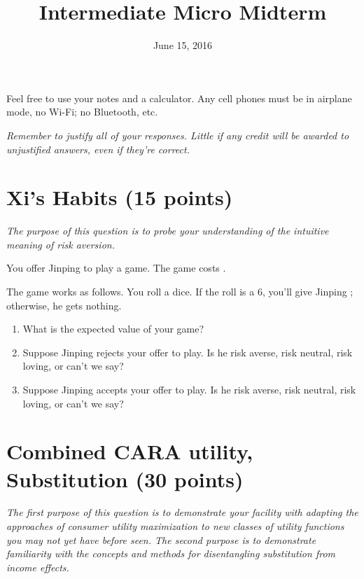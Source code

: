 \documentclass{article}
\begin{document}
\title{Intermediate Micro Midterm}

\date{June 15, 2016}

\maketitle

Feel free to use your notes and a calculator. Any cell phones must be in airplane mode, no Wi-Fi; no Bluetooth, etc.	

\textit{Remember to justify all of your responses. Little if any credit will be awarded to unjustified answers, even if they're correct.}

\section*{Xi's Habits (15 points)}

\small{\textit{The purpose of this question is to probe your understanding of the intuitive meaning of risk aversion.}}

You offer Jinping to play a game. The game costs .

The game works as follows. You roll a dice. If the roll is a 6, you'll give Jinping ; otherwise, he gets nothing.

\begin{enumerate}
\item What is the expected value of your game?

\item Suppose Jinping rejects your offer to play. Is he risk averse, risk neutral, risk loving, or can't we say?

\item Suppose Jinping accepts your offer to play. Is he risk averse, risk neutral, risk loving, or can't we say? 
\end{enumerate}

\section*{Combined CARA utility, Substitution (30 points)}

\small{\textit{The first purpose of this question is to demonstrate your facility with adapting the approaches of consumer utility maximization to new classes of utility functions you may not yet have before seen. The second purpose is to demonstrate familiarity with the concepts and methods for disentangling substitution from income effects.}}
\end{document}
